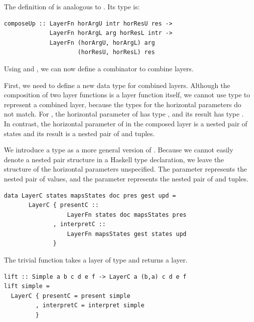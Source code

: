 \documentclass[preprint,natbib]{sigplanconf}
\begin{document}
The definition of  is analogous to . Its type is:

\begin{small}
\begin{verbatim}
composeUp :: LayerFn horArgU intr horResU res ->
             LayerFn horArgL arg horResL intr ->
             LayerFn (horArgU, horArgL) arg
                     (horResU, horResL) res
\end{verbatim}
\end{small}


Using  and , we can now define a combinator to combine  layers. 


First, we need to define a new data type for combined layers. Although the composition of two layer functions is a layer function itself, we cannot use type  to represent a combined layer, because the types for the horizontal parameters do not match.  For , the horizontal parameter of  has type , and its result has type . In contrast, the horizontal parameter of  in the composed layer is a nested pair of states and its result is a nested pair of  and  tuples. 

We introduce a type  as a more general version of . Because we cannot easily denote a nested pair structure in a Haskell type declaration, we leave the structure of the horizontal parameters unspecified. The parameter  represents the nested pair of  values, and the parameter  represents the nested pair of  and  tuples.

\begin{small}
\begin{verbatim}
data LayerC states mapsStates doc pres gest upd =
       LayerC { presentC ::   
                  LayerFn states doc mapsStates pres
              , interpretC :: 
                  LayerFn mapsStates gest states upd
              }
\end{verbatim}
\end{small}

The trivial function  takes a layer of type  and returns a  layer.

\begin{small}
\begin{verbatim}
lift :: Simple a b c d e f -> LayerC a (b,a) c d e f
lift simple = 
  LayerC { presentC = present simple
         , interpretC = interpret simple
         }
\end{verbatim}
\end{small}
\end{document}
